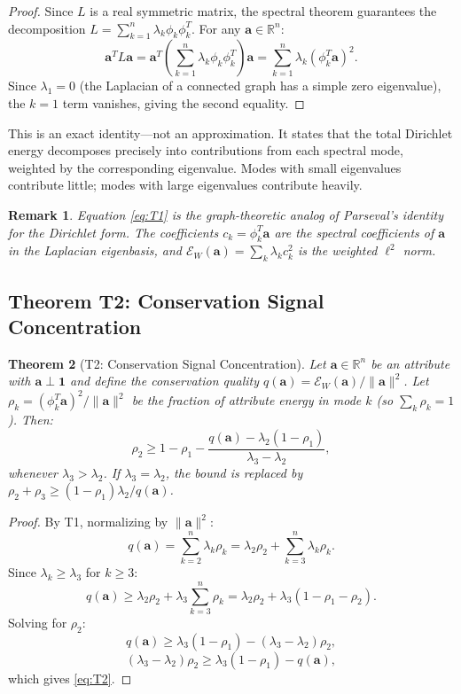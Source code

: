 \documentclass[12pt,letterpaper]{article}
\newtheorem{theorem}{Theorem}[section]
\newtheorem{remark}[theorem]{Remark}
\newcommand{\R}{\mathbb{R}}
\newcommand{\One}{\mathbf{1}}
\newcommand{\bfa}{\mathbf{a}}
\newcommand{\cE}{\mathcal{E}}
\begin{document}
\begin{proof}
Since $L$ is a real symmetric matrix, the spectral theorem guarantees the decomposition $L = \sum_{k=1}^{n} \lambda_k \phi_k \phi_k^T$. For any $\bfa \in \R^n$:
\[
  \bfa^T L \bfa = \bfa^T \left(\sum_{k=1}^{n} \lambda_k \phi_k \phi_k^T\right) \bfa = \sum_{k=1}^{n} \lambda_k (\phi_k^T \bfa)^2.
\]
Since $\lambda_1 = 0$ (the Laplacian of a connected graph has a simple zero eigenvalue), the $k=1$ term vanishes, giving the second equality.
\end{proof}

This is an exact identity---not an approximation. It states that the total Dirichlet energy decomposes precisely into contributions from each spectral mode, weighted by the corresponding eigenvalue. Modes with small eigenvalues contribute little; modes with large eigenvalues contribute heavily.

\begin{remark}
Equation \eqref{eq:T1} is the graph-theoretic analog of Parseval's identity for the Dirichlet form. The coefficients $c_k = \phi_k^T \bfa$ are the spectral coefficients of $\bfa$ in the Laplacian eigenbasis, and $\cE_W(\bfa) = \sum_k \lambda_k c_k^2$ is the weighted $\ell^2$ norm.
\end{remark}

\subsection{Theorem T2: Conservation Signal Concentration}
\label{sec:T2}

\begin{theorem}[T2: Conservation Signal Concentration]
\label{thm:T2}
Let $\bfa \in \R^n$ be an attribute with $\bfa \perp \One$ and define the conservation quality $q(\bfa) = \cE_W(\bfa)/\|\bfa\|^2$. Let $\rho_k = (\phi_k^T \bfa)^2 / \|\bfa\|^2$ be the fraction of attribute energy in mode $k$ (so $\sum_k \rho_k = 1$). Then:
\begin{equation}
\label{eq:T2}
  \rho_2 \geq 1 - \rho_1 - \frac{q(\bfa) - \lambda_2(1 - \rho_1)}{\lambda_3 - \lambda_2},
\end{equation}
whenever $\lambda_3 > \lambda_2$. If $\lambda_3 = \lambda_2$, the bound is replaced by $\rho_2 + \rho_3 \geq (1 - \rho_1) \lambda_2/q(\bfa)$.
\end{theorem}

\begin{proof}
By T1, normalizing by $\|\bfa\|^2$:
\[
  q(\bfa) = \sum_{k=2}^{n} \lambda_k \rho_k = \lambda_2 \rho_2 + \sum_{k=3}^{n} \lambda_k \rho_k.
\]
Since $\lambda_k \geq \lambda_3$ for $k \geq 3$:
\[
  q(\bfa) \geq \lambda_2 \rho_2 + \lambda_3 \sum_{k=3}^{n} \rho_k = \lambda_2 \rho_2 + \lambda_3(1 - \rho_1 - \rho_2).
\]
Solving for $\rho_2$:
\[
  q(\bfa) \geq \lambda_3(1 - \rho_1) - (\lambda_3 - \lambda_2)\rho_2,
\]
\[
  (\lambda_3 - \lambda_2)\rho_2 \geq \lambda_3(1 - \rho_1) - q(\bfa),
\]
which gives \eqref{eq:T2}.
\end{proof}
\end{document}

